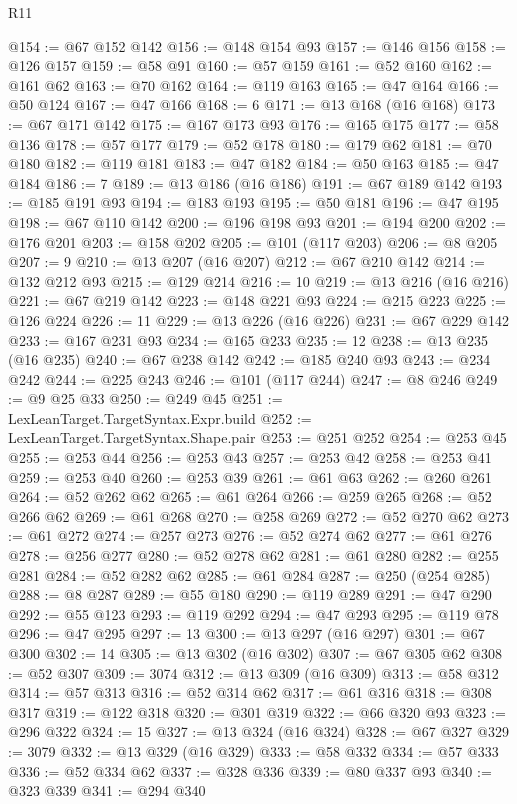\begin{lexlean}{R11}
\begin{coremodule}
@154 := @67 @152 @142
@156 := @148 @154 @93
@157 := @146 @156
@158 := @126 @157
@159 := @58 @91
@160 := @57 @159
@161 := @52 @160
@162 := @161 @62
@163 := @70 @162
@164 := @119 @163
@165 := @47 @164
@166 := @50 @124
@167 := @47 @166
@168 := 6
@171 := @13 @168 (@16 @168)
@173 := @67 @171 @142
@175 := @167 @173 @93
@176 := @165 @175
@177 := @58 @136
@178 := @57 @177
@179 := @52 @178
@180 := @179 @62
@181 := @70 @180
@182 := @119 @181
@183 := @47 @182
@184 := @50 @163
@185 := @47 @184
@186 := 7
@189 := @13 @186 (@16 @186)
@191 := @67 @189 @142
@193 := @185 @191 @93
@194 := @183 @193
@195 := @50 @181
@196 := @47 @195
@198 := @67 @110 @142
@200 := @196 @198 @93
@201 := @194 @200
@202 := @176 @201
@203 := @158 @202
@205 := @101 (@117 @203)
@206 := @8 @205
@207 := 9
@210 := @13 @207 (@16 @207)
@212 := @67 @210 @142
@214 := @132 @212 @93
@215 := @129 @214
@216 := 10
@219 := @13 @216 (@16 @216)
@221 := @67 @219 @142
@223 := @148 @221 @93
@224 := @215 @223
@225 := @126 @224
@226 := 11
@229 := @13 @226 (@16 @226)
@231 := @67 @229 @142
@233 := @167 @231 @93
@234 := @165 @233
@235 := 12
@238 := @13 @235 (@16 @235)
@240 := @67 @238 @142
@242 := @185 @240 @93
@243 := @234 @242
@244 := @225 @243
@246 := @101 (@117 @244)
@247 := @8 @246
@249 := @9 @25 @33
@250 := @249 @45
@251 := LexLeanTarget.TargetSyntax.Expr.build
@252 := LexLeanTarget.TargetSyntax.Shape.pair
@253 := @251 @252
@254 := @253 @45
@255 := @253 @44
@256 := @253 @43
@257 := @253 @42
@258 := @253 @41
@259 := @253 @40
@260 := @253 @39
@261 := @61 @63
@262 := @260 @261
@264 := @52 @262 @62
@265 := @61 @264
@266 := @259 @265
@268 := @52 @266 @62
@269 := @61 @268
@270 := @258 @269
@272 := @52 @270 @62
@273 := @61 @272
@274 := @257 @273
@276 := @52 @274 @62
@277 := @61 @276
@278 := @256 @277
@280 := @52 @278 @62
@281 := @61 @280
@282 := @255 @281
@284 := @52 @282 @62
@285 := @61 @284
@287 := @250 (@254 @285)
@288 := @8 @287
@289 := @55 @180
@290 := @119 @289
@291 := @47 @290
@292 := @55 @123
@293 := @119 @292
@294 := @47 @293
@295 := @119 @78
@296 := @47 @295
@297 := 13
@300 := @13 @297 (@16 @297)
@301 := @67 @300
@302 := 14
@305 := @13 @302 (@16 @302)
@307 := @67 @305 @62
@308 := @52 @307
@309 := 3074
@312 := @13 @309 (@16 @309)
@313 := @58 @312
@314 := @57 @313
@316 := @52 @314 @62
@317 := @61 @316
@318 := @308 @317
@319 := @122 @318
@320 := @301 @319
@322 := @66 @320 @93
@323 := @296 @322
@324 := 15
@327 := @13 @324 (@16 @324)
@328 := @67 @327
@329 := 3079
@332 := @13 @329 (@16 @329)
@333 := @58 @332
@334 := @57 @333
@336 := @52 @334 @62
@337 := @328 @336
@339 := @80 @337 @93
@340 := @323 @339
@341 := @294 @340

\end{coremodule}
\end{lexlean}
